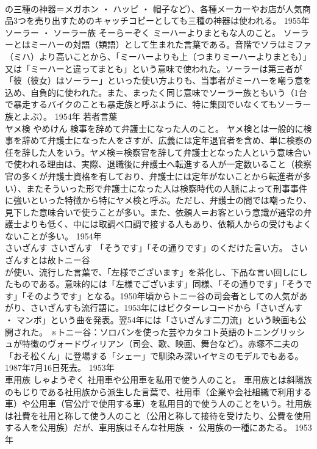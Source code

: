 \documentclass[8pt]{extreport}
\begin{document}
\begin{CJK}{UTF8}{min}
\\	の三種の神器＝メガホン ・ ハッピ ・ 帽子など）、各種メーカーやお店が人気商品3つを売り出すためのキャッチコピーとしても三種の神器は使われる。	1955年	
\\	ソーラー ・ ソーラー族	そーらーぞく	ミーハーよりまともな人のこと。	ソーラーとはミーハーの対語（類語）として生まれた言葉である。音階でソラはミファ（ミハ）より高いことから、「ミーハーよりも上（つまりミーハーよりまとも）」又は「ミーハーと違ってまとも」という意味で使われた。ソーラーは第三者が「彼（彼女）はソーラー」といった使い方よりも、当事者がミーハーを嘲う意を込め、自負的に使われた。また、まったく同じ意味でソーラー族ともいう（1台で暴走するバイクのことも暴走族と呼ぶように、特に集団でいなくてもソーラー族とよぶ）。	1954年	若者言葉	
\\	ヤメ検	やめけん	検事を辞めて弁護士になった人のこと。	ヤメ検とは一般的に検事を辞めて弁護士になった人をさすが、広義には定年退官者を含め、単に検察の任を辞した人をいう。ヤメ検＝検察官を辞して弁護士となった人という意味合いで使われる理由は、実際、退職後に弁護士へ転進する人が一定数いること（検察官の多くが弁護士資格を有しており、弁護士には定年がないことから転進者が多い）、またそういった形で弁護士になった人は検察時代の人脈によって刑事事件に強いといった特徴から特にヤメ検と呼ぶ。ただし、弁護士の間では嘲ったり、見下した意味合いで使うことが多い。また、依頼人＝お客という意識が通常の弁護士よりも低く、中には取調べ口調で接する人もあり、依頼人からの受けもよくないことが多い。	1954年	
\\	さいざんす	さいざんす	「そうです」「その通りです」のくだけた言い方。	さいざんすとは故トニー谷
\\	が使い、流行した言葉で、「左様でございます」を茶化し、下品な言い回しにしたものである。意味的には「左様でございます」同様、「その通りです」「そうです」「そのようです」となる。1950年頃からトニー谷の司会者としての人気があがり、さいざんすも流行語に。1953年にはビクターレコードから「さいざんす ・ マンボ」という曲を発表。翌54年には「さいざんす二刀流」という映画も公開された。 ※トニー谷：ソロバンを使った芸やカタコト英語のトニングリッシュが特徴のヴォードヴィリアン（司会、歌、映画、舞台など）。赤塚不二夫の「おそ松くん」に登場する「シェー」で馴染み深いイヤミのモデルでもある。1987年7月16日死去。	1953年	
\\	車用族	しゃようぞく	社用車や公用車を私用で使う人のこと。	車用族とは斜陽族のもじりである社用族から派生した言葉で、社用車（企業や会社組織で利用する車）や公用車（官公庁で使用する車）を私用目的で使う人のことをいう。社用族は社費を社用と称して使う人のこと（公用と称して接待を受けたり、公費を使用する人を公用族）だが、車用族はそんな社用族 ・ 公用族の一種にあたる。	1953年	

\end{CJK}
\end{document}
